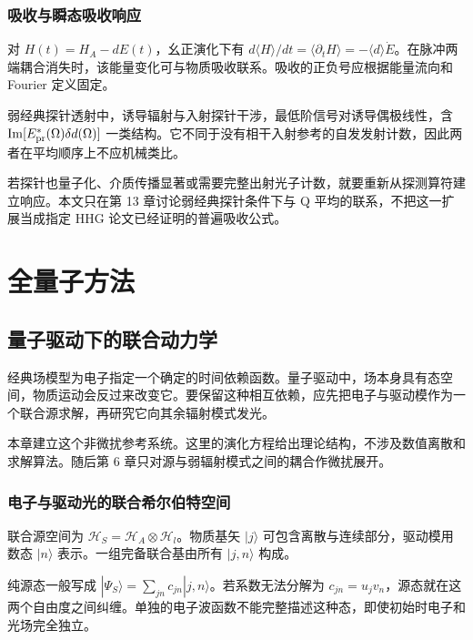 \documentclass[UTF8,a4paper,zihao=-4,openany,fontset=fandol]{ctexbook}
\begin{document}
\section{吸收与瞬态吸收响应}\label{sec:04:9}


对 $H(t)=H_A-dE(t)$，幺正演化下有 $d\langle H\rangle/dt=\langle\partial_tH\rangle=-\langle d\rangle\dot E$。在脉冲两端耦合消失时，该能量变化可与物质吸收联系。吸收的正负号应根据能量流向和 Fourier 定义固定。



弱经典探针透射中，诱导辐射与入射探针干涉，最低阶信号对诱导偶极线性，含 $\operatorname{Im}[E_{\rm pr}^*(\Omega)\delta d(\Omega)]$ 一类结构。它不同于没有相干入射参考的自发发射计数，因此两者在平均顺序上不应机械类比。



若探针也量子化、介质传播显著或需要完整出射光子计数，就要重新从探测算符建立响应。本文只在第 13 章讨论弱经典探针条件下与 Q 平均的联系，不把这一扩展当成指定 HHG 论文已经证明的普遍吸收公式。


\part{全量子方法}


\chapter{量子驱动下的联合动力学}\label{ch:05}


经典场模型为电子指定一个确定的时间依赖函数。量子驱动中，场本身具有态空间，物质运动会反过来改变它。要保留这种相互依赖，应先把电子与驱动模作为一个联合源求解，再研究它向其余辐射模式发光。



本章建立这个非微扰参考系统。这里的演化方程给出理论结构，不涉及数值离散和求解算法。随后第 6 章只对源与弱辐射模式之间的耦合作微扰展开。



\section{电子与驱动光的联合希尔伯特空间}\label{sec:05:1}


联合源空间为 $\mathcal H_S=\mathcal H_A\otimes\mathcal H_l$。物质基矢 $|j\rangle$ 可包含离散与连续部分，驱动模用数态 $|n\rangle$ 表示。一组完备联合基由所有 $|j,n\rangle$ 构成。



纯源态一般写成 $|\Psi_S\rangle=\sum_{jn}c_{jn}|j,n\rangle$。若系数无法分解为 $c_{jn}=u_jv_n$，源态就在这两个自由度之间纠缠。单独的电子波函数不能完整描述这种态，即使初始时电子和光场完全独立。
\end{document}
